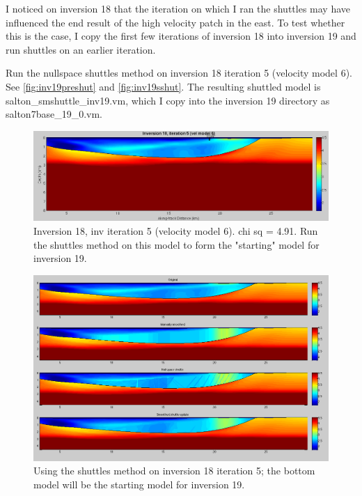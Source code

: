 \documentclass[fontsize=11pt, %
                             paper=a4, %
                             twoside, %
                             captions=tableheading,
                             index=totoc,
                             hyperref]{labbook}
\begin{document}
\begin{addmargin}[4cm]{0cm}
I noticed on inversion 18 that the iteration on which I ran the shuttles may have influenced the end result of the high velocity patch in the east.  To test whether this is the case, I copy the first few iterations of inversion 18 into inversion 19 and run shuttles on an earlier iteration.  

Run the nullspace shuttles method on inversion 18 iteration 5 (velocity model 6).  See \autoref{fig:inv19preshut} and \autoref{fig:inv19sshut}.  The resulting shuttled model is salton\_smshuttle\_inv19.vm, which I copy into the inversion 19 directory as salton7base\_19\_0.vm.  

\begin{figure}[h!]
\raggedleft
\includegraphics[scale=0.4,keepaspectratio=true]{figs/Inv18It5pre19.png}
\caption{Inversion 18, inv iteration 5 (velocity model 6).  chi sq = 4.91.  Run the shuttles method on this model to form the "starting" model for inversion 19.}
\label{fig:inv19preshut}
\end{figure} 

\begin{figure}[h!]
\raggedleft
\includegraphics[scale=0.4,keepaspectratio=true]{figs/Inv19startshut.png}
\caption{Using the shuttles method on inversion 18 iteration 5; the bottom model will be the starting model for inversion 19.}
\label{fig:inv19sshut}
\end{figure} 


\end{addmargin}
\end{document}
